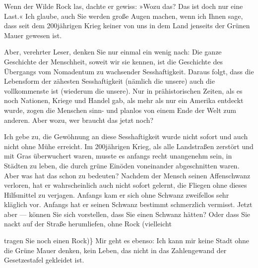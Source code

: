 Wenn der Wilde Rock las, dachte er gewiss: »Wozu das? Das ist doch
nur eine Last.« Ich glaube, auch Sie werden große Augen machen,
wenn ich Ihnen sage, dass seit dem 200jährigen Krieg keiner von uns
in dem Land jenseits der Grünen Mauer gewesen ist.

Aber, verehrter Leser, denken Sie nur einmal ein wenig nach: Die
ganze Geschichte der Menschheit, soweit wir sie kennen, ist die
Geschichte des Übergangs vom Nomadentum zu wachsender
Sesshaftigkeit. Daraus folgt, dass die Lebensform der zähesten
Sesshaftigkeit (nämlich die unsere) auch die vollkommenste ist
(wiederum die unsere). Nur in prähistorischen Zeiten, als es noch
Nationen, Kriege und Handel gab, als mehr als nur ein Amerika
entdeckt wurde, zogen die Menschen sinn- und planlos von einem Ende
der Welt zum anderen. Aber wozu, wer braucht das jetzt noch?

Ich gebe zu, die Gewöhnung an diese Sesshaftigkeit wurde nicht
sofort und auch nicht ohne Mühe erreicht. Im 200jährigen Krieg, als
alle Landstraßen zerstört und mit Gras überwuchert waren, musste es
anfangs recht unangenehm sein, in Städten zu leben, die durch grüne
Ein­öden voneinander abgeschnitten waren. Aber was hat das schon zu
bedeuten? Nachdem der Mensch seinen Affenschwanz verloren, hat er
wahrscheinlich auch nicht sofort gelernt, die Fliegen ohne dieses
Hilfsmittel zu verjagen. Anfangs kam er sich ohne Schwanz
zweifellos sehr kläglich vor. Anfangs hat er seinen Schwanz
bestimmt schmerzlich vermisst. Jetzt aber — können Sie sich
vorstellen, dass Sie einen Schwanz hätten? Oder dass Sie nackt auf
der Straße herumliefen, ohne Rock (vielleicht

tragen Sie noch einen Rock)\} Mir geht es ebenso: Ich kann mir
keine Stadt ohne die Grüne Mauer denken, kein Leben, das nicht in
das Zahlengewand der Gesetzestafel gekleidet ist.

